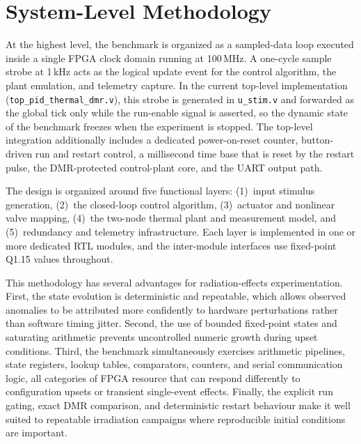 \section{System-Level Methodology}
\label{sec:bench_system}

At the highest level, the benchmark is organized as a sampled-data loop
executed inside a single FPGA clock domain running at 100\,MHz.  A
one-cycle sample strobe at 1\,kHz acts as the logical update event for
the control algorithm, the plant emulation, and telemetry capture.  In
the current top-level implementation (\texttt{top\_pid\_thermal\_dmr.v}),
this strobe is generated in \texttt{u\_stim.v} and forwarded as the
global tick only while the run-enable signal is asserted, so the dynamic
state of the benchmark freezes when the experiment is stopped.  The
top-level integration additionally includes a dedicated power-on-reset
counter, button-driven run and restart control, a millisecond time base
that is reset by the restart pulse, the DMR-protected control-plant
core, and the UART output path.

The design is organized around five functional layers:
(1)~input stimulus generation,
(2)~the closed-loop control algorithm,
(3)~actuator and nonlinear valve mapping,
(4)~the two-node thermal plant and measurement model, and
(5)~redundancy and telemetry infrastructure.
Each layer is implemented in one or more dedicated RTL modules, and the
inter-module interfaces use fixed-point Q1.15 values throughout.

This methodology has several advantages for radiation-effects
experimentation.  First, the state evolution is deterministic and
repeatable, which allows observed anomalies to be attributed more
confidently to hardware perturbations rather than software timing
jitter.  Second, the use of bounded fixed-point states and saturating
arithmetic prevents uncontrolled numeric growth during upset conditions.
Third, the benchmark simultaneously exercises arithmetic pipelines,
state registers, lookup tables, comparators, counters, and serial
communication logic, all categories of FPGA resource that can respond
differently to configuration upsets or transient single-event effects.
Finally, the explicit run gating, exact DMR comparison, and
deterministic restart behaviour make it well suited to repeatable
irradiation campaigns where reproducible initial conditions are
important.

